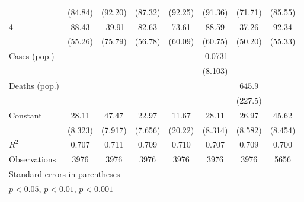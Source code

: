\documentclass{article}
\begin{document}
{\begin{longtable}{l*{7}{c}}
                &  (84.84)         &  (92.20)         &  (87.32)         &  (92.25)         &  (91.36)         &  (71.71)         &  (85.55)         \\
4               &    88.43         &   -39.91         &    82.63         &    73.61         &    88.59         &    37.26         &    92.34         \\
                &  (55.26)         &  (75.79)         &  (56.78)         &  (60.09)         &  (60.75)         &  (50.20)         &  (55.33)         \\
Cases (pop.)    &                  &                  &                  &                  &  -0.0731         &                  &                  \\
                &                  &                  &                  &                  &  (8.103)         &                  &                  \\
Deaths (pop.)   &                  &                  &                  &                  &                  &    645.9\sym{**} &                  \\
                &                  &                  &                  &                  &                  &  (227.5)         &                  \\
Constant        &    28.11\sym{**} &    47.47\sym{***}&    22.97\sym{**} &    11.67         &    28.11\sym{**} &    26.97\sym{**} &    45.62\sym{***}\\
                &  (8.323)         &  (7.917)         &  (7.656)         &  (20.22)         &  (8.314)         &  (8.582)         &  (8.454)         \\
\hline
\(R^{2}\)       &    0.707         &    0.711         &    0.709         &    0.710         &    0.707         &    0.709         &    0.700         \\
Observations    &     3976         &     3976         &     3976         &     3976         &     3976         &     3976         &     5656         \\
\hline\hline
\multicolumn{8}{l}{\footnotesize Standard errors in parentheses}\\
\multicolumn{8}{l}{\footnotesize \sym{*} \(p<0.05\), \sym{**} \(p<0.01\), \sym{***} \(p<0.001\)}\\
\end{longtable}
}
\end{document}
